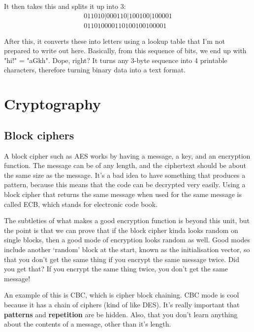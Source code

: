 \documentclass[11pt,a4paper,titlepage]{scrartcl}
\begin{document}
It then takes this and splits it up into 3:
\begin{align*}
    0110 10|00 0110|1001 00|10 0001 \\
    011010 000110 100100 100001
\end{align*}

After this, it converts these into letters using a lookup table that I'm
not prepared to write out here. Basically, from this sequence of bits, we
end up with "hi!" = "aGkh". Dope, right? It turns any 3-byte sequence into
4 printable characters, therefore turning binary data into a text format. 

\section{Cryptography}%
\label{sec:Cryptography}

\subsection{Block ciphers}%
\label{sub:block}

A block cipher such as AES works by having a message, a key, and an
encryption function. The message can be of any length, and the ciphertext
should be about the same size as the message. It's a bad idea to have
something that produces a pattern, because this means that the code can be
decrypted very easily. Using a block cipher that returns the same message
when used for the same message is called ECB, which stands for electronic
code book.

The subtleties of what makes a good encryption function is beyond this
unit, but the point is that we can prove that if the block cipher kinda
looks random on single blocks, then a good mode of encryption looks random
as well. Good modes include another `random' block at the start, known as
the initialisation vector, so that you don't get the same thing if you
encrypt the same message twice. Did you get that? If you encrypt the same
thing twice, you don't get the same message! 

An example of this is CBC, which is cipher block chaining. CBC mode is
cool because it has a chain of ciphers (kind of like DES). It's really
important that \textbf{patterns} and \textbf{repetition} are be hidden.
Also, that you don't learn anything about the contents of a message, other
than it's length.
\end{document}
